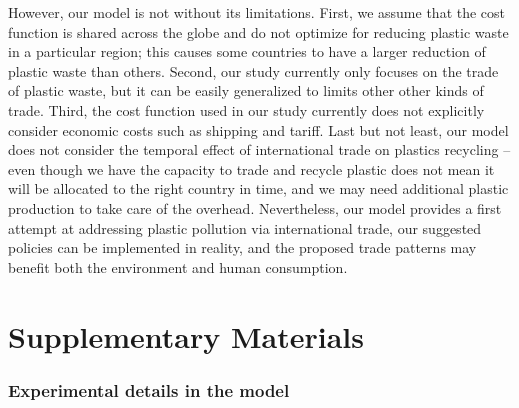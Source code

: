 \documentclass[dvipsnames]{article}
\begin{document}
However, our model is not without its limitations. First, we assume that the cost function is shared across the globe and do not optimize for reducing plastic waste in a particular region; this causes some countries to have a larger reduction of plastic waste than others. Second, our study currently only focuses on the trade of plastic waste, but it can be easily generalized to limits other other kinds of trade. Third, the cost function used in our study currently does not explicitly consider economic costs such as shipping and tariff. Last but not least, our model does not consider the temporal effect of international trade on plastics recycling -- even though we have the capacity to trade and recycle plastic does not mean it will be allocated to the right country in time, and we may need additional plastic production to take care of the overhead. Nevertheless, our model provides a first attempt at addressing plastic pollution via international trade, our suggested policies can be implemented in reality, and the proposed trade patterns may benefit both the environment and human consumption. 



\pagebreak

\appendix
\part*{\Large Supplementary Materials}



\section{Experimental details in the model}
\end{document}
